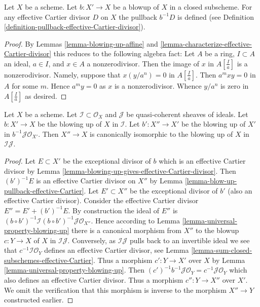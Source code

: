 \begin{lemma}
\label{lemma-blow-up-pullback-effective-Cartier}
Let $X$ be a scheme. Let $b : X' \to X$ be a blowup of $X$ in a closed
subscheme. For any effective Cartier divisor $D$ on $X$ the pullback
$b^{-1}D$ is defined (see Definition
\ref{definition-pullback-effective-Cartier-divisor}).
\end{lemma}

\begin{proof}
By Lemmas \ref{lemma-blowing-up-affine} and
\ref{lemma-characterize-effective-Cartier-divisor}
this reduces to the following algebra fact:
Let $A$ be a ring, $I \subset A$ an ideal, $a \in I$, and $x \in A$
a nonzerodivisor. Then the image of $x$ in $A[\frac{I}{a}]$ is a
nonzerodivisor. Namely, suppose that $x (y/a^n) = 0$ in $A[\frac{I}{a}]$.
Then $a^mxy = 0$ in $A$ for some $m$. Hence $a^my = 0$ as $x$ is a
nonzerodivisor. Whence $y/a^n$ is zero in $A[\frac{I}{a}]$ as desired.
\end{proof}

\begin{lemma}
\label{lemma-blowing-up-two-ideals}
Let $X$ be a scheme. Let $\mathcal{I} \subset \mathcal{O}_X$ and
$\mathcal{J}$ be quasi-coherent sheaves of ideals. Let $b : X' \to X$
be the blowing up of $X$ in $\mathcal{I}$. Let $b' : X'' \to X'$ be the
blowing up of $X'$ in $b^{-1}\mathcal{J} \mathcal{O}_{X'}$. Then $X'' \to X$
is canonically isomorphic to the blowing up of $X$ in $\mathcal{I}\mathcal{J}$.
\end{lemma}

\begin{proof}
Let $E \subset X'$ be the exceptional divisor of $b$ which is an effective
Cartier divisor by
Lemma \ref{lemma-blowing-up-gives-effective-Cartier-divisor}.
Then $(b')^{-1}E$ is an effective Cartier divisor on $X''$ by
Lemma \ref{lemma-blow-up-pullback-effective-Cartier}.
Let $E' \subset X''$ be the exceptional divisor of $b'$ (also an effective
Cartier divisor). Consider the effective Cartier divisor
$E'' = E' + (b')^{-1}E$. By construction the ideal of $E''$ is
$(b \circ b')^{-1}\mathcal{I} (b \circ b')^{-1}\mathcal{J} \mathcal{O}_{X''}$.
Hence according to Lemma \ref{lemma-universal-property-blowing-up}
there is a canonical morphism from $X''$ to the blowup $c : Y \to X$
of $X$ in $\mathcal{I}\mathcal{J}$. Conversely, as $\mathcal{I}\mathcal{J}$
pulls back to an invertible ideal we see that
$c^{-1}\mathcal{I}\mathcal{O}_Y$ defines
an effective Cartier divisor, see
Lemma \ref{lemma-sum-closed-subschemes-effective-Cartier}.
Thus a morphism $c' : Y \to X'$ over $X$ by
Lemma \ref{lemma-universal-property-blowing-up}.
Then $(c')^{-1}b^{-1}\mathcal{J}\mathcal{O}_Y = c^{-1}\mathcal{J}\mathcal{O}_Y$
which also defines an effective Cartier divisor. Thus a morphism
$c'' : Y \to X''$ over $X'$. We omit the verification that this
morphism is inverse to the morphism $X'' \to Y$ constructed earlier.
\end{proof}


